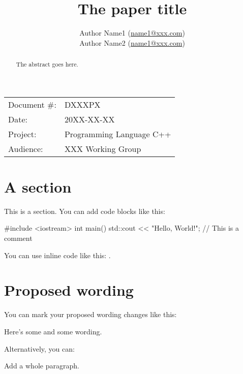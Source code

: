 


\title{The paper title}
\author{
Author Name1 \small(\href{mailto:name1@xxx.com}{name1@xxx.com}) \\
Author Name2 \small(\href{mailto:name2@xxx.com}{name1@xxx.com})}
\date{} %
\maketitle

\begin{tabular}{ll}
Document \#: & DXXXPX \\
Date: &20XX-XX-XX \\
Project: & Programming Language C++ \\
Audience: & XXX Working Group
\end{tabular}

\begin{abstract}
The abstract goes here.
\end{abstract}

\section{A section}
\label{sec:a section}

This is a section. You can add code blocks like this:

\begin{codeblock}
#include <iostream>
int main() {
   std::cout << "Hello, World!\n"; // This is a comment
}
\end{codeblock}

You can use inline code like this: .

\section{Proposed wording}
\label{sec:solution}

You can mark your proposed wording changes like this:

\begin{adjustwidth}{1cm}{1cm}
Here's some  and some  wording.
\end{adjustwidth}

Alternatively, you can:

\begin{adjustwidth}{1cm}{1cm}
\begin{addedblock}
Add a whole paragraph.
\end{addedblock}
\end{adjustwidth}

